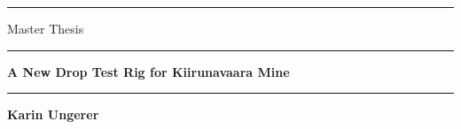 \begin{titlepage}

\textcolor{gray}{\rule{\textwidth}{0.2pt}}

\vspace{2pt}

\raggedright{\large {Master Thesis}} 

\vspace{2pt}

\textcolor{gray}{\rule{\textwidth}{0.2pt}}

\vspace{1cm}

\centering

\huge \textbf {A New Drop Test Rig for Kiirunavaara Mine}

\vspace{1cm}

\textcolor{gray}{\rule{\textwidth}{0.2pt}}

\vspace{\fill}

\large \textbf {\LARGE{Karin Ungerer}}
\\

\vspace{\fill}


\end{titlepage}
